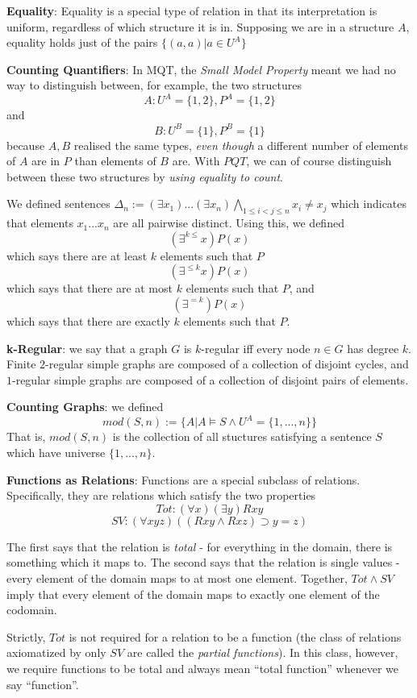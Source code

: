 \begin{mdframed}[linewidth=1]
\textbf{Equality}: Equality is a special type of relation in that its interpretation is uniform, regardless of which structure it is in. Supposing we are in a structure $A$, equality holds just of the pairs $\{(a, a) | a \in U^A\}$

\textbf{Counting Quantifiers}: In MQT, the \emph{Small Model Property} meant we had no way to distinguish between, for example, the two structures 
\[
    A: U^A = \{1, 2\}, P^A = \{1, 2\}
\]
and
\[
    B: U^B = \{1\}, P^B = \{1\}
\]
because $A, B$ realised the same types, \emph{even though} a different number of elements of $A$ are in $P$ than elements of $B$ are. With $PQT$, we can of course distinguish between these two structures by \emph{using equality to count}. 

We defined sentences $\Delta_n:= (\exists x_1)...(\exists x_n)\bigwedge_{1 \leq i < j \leq n}x_i \neq x_j$ which indicates that elements $x_1...x_n$ are all pairwise distinct. Using this, we defined
\[
    (\exists^{k \leq}x)P(x)
\]
which says there are at least $k$ elements such that $P$
\[
    (\exists^{\leq k}x)P(x)
\]
which says that there are at most $k$ elements such that $P$, and
\[
    (\exists^{=k})P(x)
\]
which says that there are exactly $k$ elements such that $P$. 

\textbf{k-Regular}: we say that a graph $G$ is $k$-regular iff every node $n \in G$ has degree $k$. Finite $2$-regular simple graphs are composed of a collection of disjoint cycles, and $1$-regular simple graphs are composed of a collection of disjoint pairs of elements. 

\textbf{Counting Graphs}: we defined
\[
    mod(S, n) := \{A | A \models S \land U^A = \{1,...,n\}\}
\]
That is, $mod(S, n)$ is the collection of all stuctures satisfying a sentence $S$ which have universe $\{1,...,n\}$. 

\textbf{Functions as Relations}:
Functions are a special subclass of relations. Specifically, they are relations which satisfy the two properties 
\[
    Tot: (\forall x)(\exists y)Rxy
\]
\[
    SV: (\forall xyz)((Rxy \land Rxz) \supset y = z)
\]

The first says that the relation is \emph{total} - for everything in the domain, there is something which it maps to. The second says that the relation is single values - every element of the domain maps to at most one element. Together, $Tot \land SV$ imply that every element of the domain maps to exactly one element of the codomain. 

Strictly, $Tot$ is not required for a relation to be a function (the class of relations axiomatized by only $SV$ are called the \emph{partial functions}). In this class, however, we require functions to be total and always mean ``total function'' whenever we say ``function''. 


\end{mdframed}
